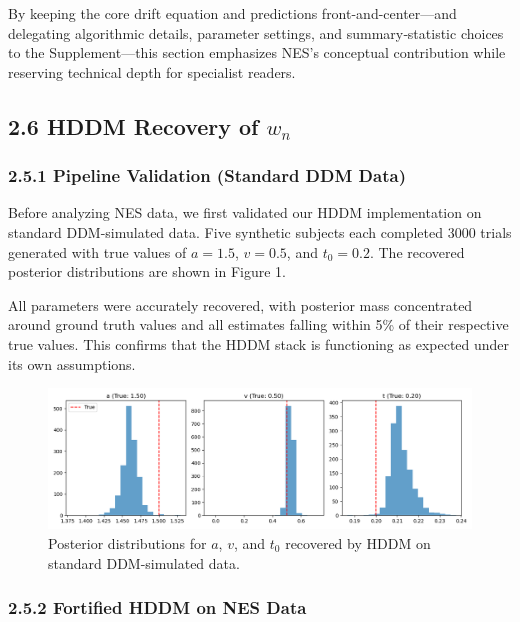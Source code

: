 \documentclass[
  11pt,
]{article}
\begin{document}
By keeping the core drift equation and predictions
front-and-center---and delegating algorithmic details, parameter
settings, and summary‐statistic choices to the Supplement---this section
emphasizes NES's conceptual contribution while reserving technical depth
for specialist readers.

\subsection{\texorpdfstring{2.6 HDDM Recovery of
\(w_n\)}{2.6 HDDM Recovery of w\_n}}\label{hddm-recovery-of-w_n}

\subsubsection{2.5.1 Pipeline Validation (Standard DDM
Data)}\label{pipeline-validation-standard-ddm-data}

Before analyzing NES data, we first validated our HDDM implementation on
standard DDM-simulated data. Five synthetic subjects each completed 3000
trials generated with true values of \(a = 1.5\), \(v = 0.5\), and
\(t_0 = 0.2\). The recovered posterior distributions are shown in Figure
1.

All parameters were accurately recovered, with posterior mass
concentrated around ground truth values and all estimates falling within
5\% of their respective true values. This confirms that the HDDM stack
is functioning as expected under its own assumptions.

\begin{figure}
\centering
\includegraphics[width=0.9\linewidth,height=\textheight,keepaspectratio]{figures/hddm_sanity_check.png}
\caption{Posterior distributions for \(a\), \(v\), and \(t_0\) recovered
by HDDM on standard DDM-simulated data.}\label{fig:hddm_sanity}
\end{figure}

\subsubsection{2.5.2 Fortified HDDM on NES
Data}\label{fortified-hddm-on-nes-data}
\end{document}
